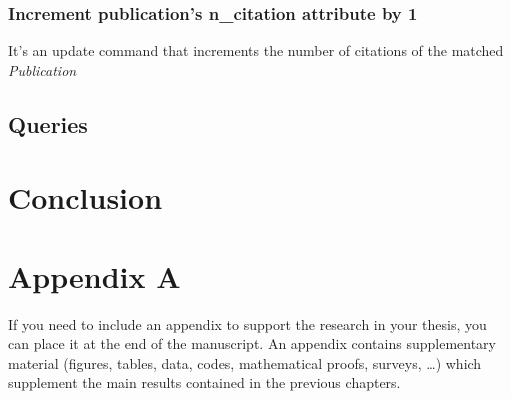 \documentclass{Configuration_Files/PoliMi3i_thesis}
\begin{document}
\subsection{Increment publication's n\_citation attribute by 1}
It's an update command that increments the number of citations of the matched \emph{Publication}


\section{Queries}


\chapter{Conclusion}


\cleardoublepage
{} %
\appendix
\chapter{Appendix A}
If you need to include an appendix to support the research in your thesis, you can place it at the end of the manuscript.
An appendix contains supplementary material (figures, tables, data, codes, mathematical proofs, surveys, \dots)
which supplement the main results contained in the previous chapters.


\listoffigures

\listoftables

\cleardoublepage
\end{document}
